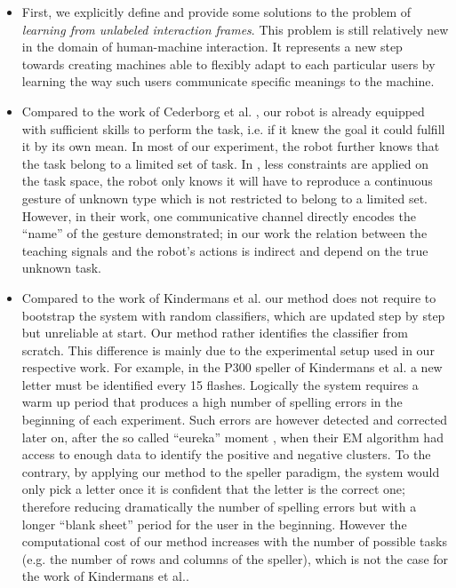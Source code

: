 \begin{itemize}

\item First, we explicitly define and provide some solutions to the problem of \emph{learning from unlabeled interaction frames}. This problem is still relatively new in the domain of human-machine interaction. It represents a new step towards creating machines able to flexibly adapt to each particular users by learning the way such users communicate specific meanings to the machine.

\item Compared to the work of Cederborg et al. \cite{cederborg2011imitating}, our robot is already equipped with sufficient skills to perform the task, i.e. if it knew the goal it could fulfill it by its own mean. In most of our experiment, the robot further knows that the task belong to a limited set of task. In \cite{cederborg2011imitating}, less constraints are applied on the task space, the robot only knows it will have to reproduce a continuous gesture of unknown type which is not restricted to belong to a limited set. However, in their work, one communicative channel directly encodes the ``name'' of the gesture demonstrated; in our work the relation between the teaching signals and the robot's actions is indirect and depend on the true unknown task.

\item Compared to the work of Kindermans et al. \cite{Kindermans2012a,kindermans2014integrating} our method does not require to bootstrap the system with random classifiers, which are updated step by step but unreliable at start. Our method rather identifies the classifier from scratch. This difference is mainly due to the experimental setup used in our respective work. For example, in the P300 speller of Kindermans et al. a new letter must be identified every 15 flashes. Logically the system requires a warm up period that produces a high number of spelling errors in the beginning of each experiment. Such errors are however detected and corrected later on, after the so called ``eureka'' moment \cite{Kindermans2012a}, when their EM algorithm had access to enough data to identify the positive and negative clusters. To the contrary, by applying our method to the speller paradigm, the system would only pick a letter once it is confident that the letter is the correct one; therefore reducing dramatically the number of spelling errors but with a longer ``blank sheet'' period for the user in the beginning. However the computational cost of our method increases with the number of possible tasks (e.g. the number of rows and columns of the speller), which is not the case for the work of Kindermans et al..


\end{itemize}
